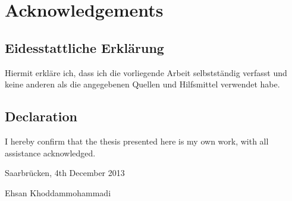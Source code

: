 \chapter*{Acknowledgements}



\newpage

\section*{Eidesstattliche Erkl\"{a}rung}
Hiermit erkl\"{a}re ich, dass ich die vorliegende Arbeit selbstst\"{a}ndig
verfasst und keine anderen als die angegebenen Quellen und Hilfsmittel
verwendet habe.

\section*{Declaration}
I hereby confirm that the thesis presented here is my own work, with all
assistance acknowledged.

\vspace{2cm}

Saarbr\"{u}cken, 4th December 2013

\vspace{2cm}
Ehsan Khoddammohammadi